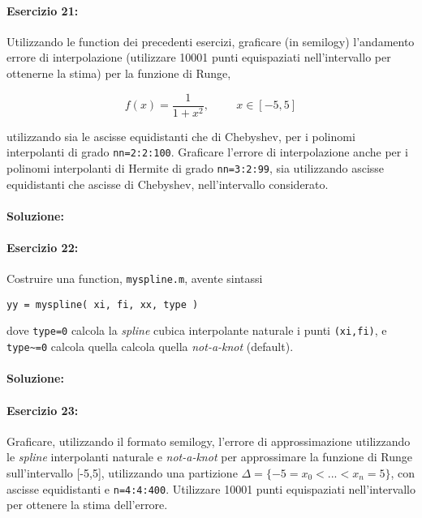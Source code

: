 \documentclass[12pt]{article}
\begin{document}
\paragraph{Esercizio 21:}
Utilizzando le function dei precedenti esercizi, graficare (in semilogy) l'andamento
errore di interpolazione (utilizzare 10001 punti equispaziati nell'intervallo per ottenerne la stima)
per la funzione di Runge,

\begin{equation}
    f(x)=\frac{1}{1+x^{2}}, \hspace{1cm} x \in [-5,5]
\end{equation}

utilizzando sia le ascisse equidistanti che di Chebyshev, per i polinomi interpolanti di grado \texttt{nn=2:2:100}.
Graficare l'errore di interpolazione anche per i polinomi interpolanti di Hermite di grado \texttt{nn=3:2:99},
sia utilizzando ascisse equidistanti che ascisse di Chebyshev, nell'intervallo considerato.

\paragraph{Soluzione:}


\paragraph{Esercizio 22:}
Costruire una function, \texttt{myspline.m}, avente sintassi
\begin{center}
\texttt{yy = myspline( xi, fi, xx, type )}
\end{center}
dove \texttt{type=0} calcola la \emph{spline} cubica interpolante naturale i punti \texttt{(xi,fi)}, e \texttt{type\textasciitilde=0} calcola quella calcola quella
\emph{not-a-knot} (default).
\paragraph{Soluzione:}


\paragraph{Esercizio 23:}
Graficare, utilizzando il formato semilogy, l'errore di approssimazione utilizzando le
\emph{spline} interpolanti naturale e \emph{not-a-knot} per approssimare la funzione di Runge sull'intervallo [-5,5],
utilizzando una partizione \(\Delta = \{-5=x_0 <...<x_n=5\}\), con ascisse equidistanti e \texttt{n=4:4:400}.
Utilizzare 10001 punti equispaziati nell'intervallo \text{[-5, 5]} per ottenere la stima dell'errore.
\end{document}
